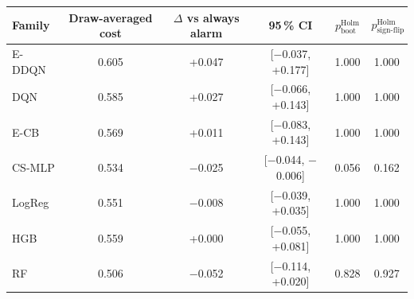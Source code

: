 \begin{tabular}{lccccc}
\toprule
Family & Draw-averaged cost & $\Delta$ vs always alarm & 95\,\% CI & $p_{\text{boot}}^{\text{Holm}}$ & $p_{\text{sign-flip}}^{\text{Holm}}$ \\
\midrule
E-DDQN & 0.605 & +0.047 & [$-$0.037, +0.177] & 1.000 & 1.000 \\
DQN & 0.585 & +0.027 & [$-$0.066, +0.143] & 1.000 & 1.000 \\
E-CB & 0.569 & +0.011 & [$-$0.083, +0.143] & 1.000 & 1.000 \\
CS-MLP & 0.534 & $-$0.025 & [$-$0.044, $-$0.006] & 0.056 & 0.162 \\
LogReg & 0.551 & $-$0.008 & [$-$0.039, +0.035] & 1.000 & 1.000 \\
HGB & 0.559 & +0.000 & [$-$0.055, +0.081] & 1.000 & 1.000 \\
RF & 0.506 & $-$0.052 & [$-$0.114, +0.020] & 0.828 & 0.927 \\
\bottomrule
\end{tabular}
